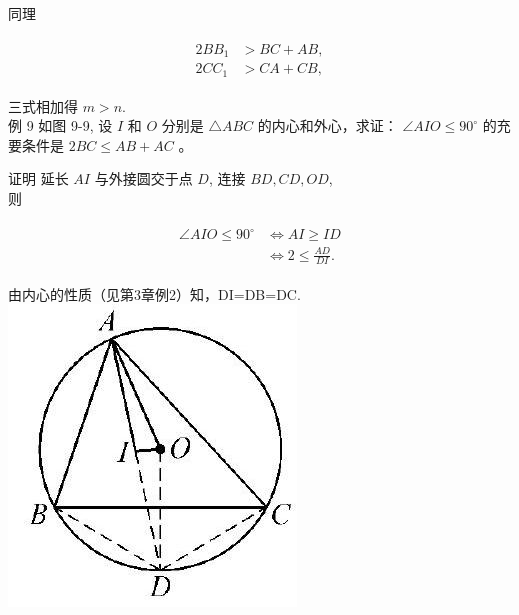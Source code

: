 \documentclass[10pt]{article}
\begin{document}
同理

\begin{align*}
\begin{aligned}
2 B B_{1} & >B C+A B, \\
2 C C_{1} & >C A+C B,
\end{aligned}
\end{align*}

三式相加得 $m>n$.\\
例 9 如图 9-9, 设 $I$ 和 $O$ 分别是 $\triangle A B C$ 的内心和外心，求证： $\angle A I O \leqslant 90^{\circ}$ 的充要条件是 $2 B C \leqslant A B+A C$ 。

证明 延长 $A I$ 与外接圆交于点 $D$, 连接 $B D, C D, O D$,\\
则

\begin{align*}
\begin{aligned}
\angle A I O \leqslant 90^{\circ} & \Leftrightarrow A I \geqslant I D \\
& \Leftrightarrow 2 \leqslant \frac{A D}{D I} .
\end{aligned}
\end{align*}

由内心的性质（见第3章例2）知，DI=DB=DC.\\
\includegraphics[max width=\textwidth, center]{2024_10_30_66b8e5e701da2093c133g-069}
\end{document}
